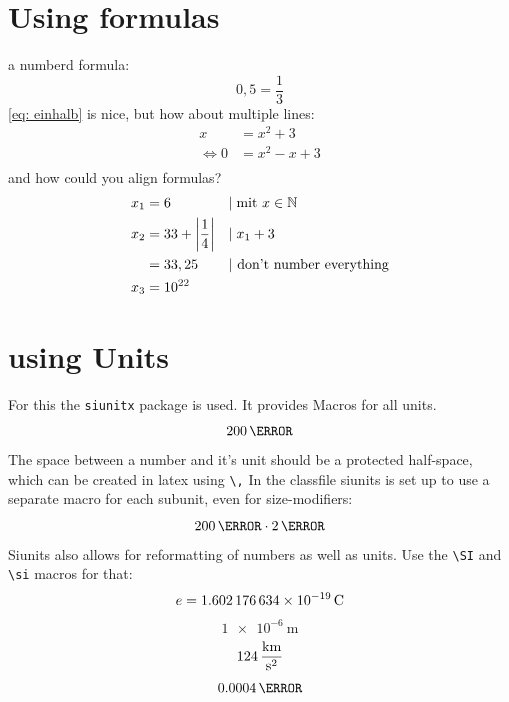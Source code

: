 \documentclass[	%
		fontsize=11pt,  %
		a4paper,	    %
		english,		%
		sans,			%
		f1,				%
	]{HsH-report}		%
\begin{document}
	\section{Using formulas} \label{sec: formula}
		a numberd formula:
		\begin{equation}
			\label{eq: einhalb} %
			0,5=\frac{1}{3}
		\end{equation}
		\autoref{eq: einhalb} is nice, but how about multiple lines:
		\begin{equation}
		\begin{split} %
			x &= x^2+3 \\
			\Leftrightarrow 0 &= x^2-x+3 \\
		\end{split}
		\end{equation}
		and how could you align formulas?
		\begin{align}
			x_1 &= 6 &&|\;\mbox{mit } x \in \mathbb{N} \\
			x_2 &= 33+\left\vert\frac{1}{4}\right\vert &&|\;x_1+3 \\
				&= 33,25 &&\mbox{| don't number everything} \notag \\
			x_3 &= 10^{22}
		\end{align}


	\section{using Units}
		For this the \lstinline{siunitx} package is used. It provides Macros for all units.
		\begin{equation}
			200\,\kg
		\end{equation}
		The space between a number and it's unit should be a protected half-space, which can be created in latex using \lstinline{\,} In the classfile
		siunits is set up to use a separate macro for each subunit, even for size-modifiers:
		\begin{equation}
			200\,\mm \cdot 2\,\volt
		\end{equation}
		Siunits also allows for reformatting of numbers as well as units. Use the \lstinline{\SI} and \lstinline{\si} macros for that:
		\begin{equation}
			e = \SI{1.602176634E-19}{\coulomb} %
		\end{equation}
		\begin{equation}
			\SI[exponent-to-prefix]{1e-6}{\metre}%
		\end{equation}
		\begin{equation}
			124\,\si[per-mode=fraction]{\kilo\metre\per\second\squared} %
		\end{equation}
		\begin{equation}
			\num{0.0004}\,\lumen %
		\end{equation}
\end{document}
